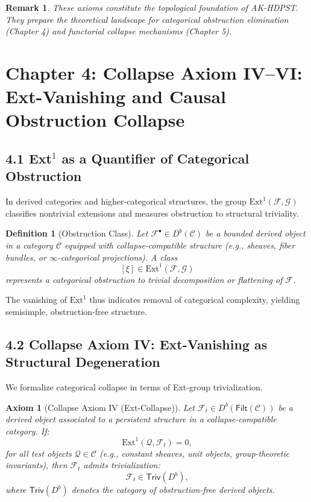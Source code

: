 \documentclass[11pt]{article}
\newtheorem{definition}[theorem]{Definition}
\newtheorem{remark}[theorem]{Remark}
\newtheorem{axiom}{Axiom}[section]
\begin{document}
\begin{remark}
These axioms constitute the topological foundation of AK-HDPST. They prepare the theoretical landscape for categorical obstruction elimination (Chapter 4) and functorial collapse mechanisms (Chapter 5).
\end{remark}



\section{Chapter 4: Collapse Axiom IV–VI: Ext-Vanishing and Causal Obstruction Collapse}

\subsection*{4.1 Ext$^1$ as a Quantifier of Categorical Obstruction}

In derived categories and higher-categorical structures, the group \( \mathrm{Ext}^1(\mathcal{F}, \mathcal{G}) \) classifies nontrivial extensions and measures obstruction to structural triviality.

\begin{definition}[Obstruction Class]
Let \( \mathcal{F}^\bullet \in D^b(\mathcal{C}) \) be a bounded derived object in a category \( \mathcal{C} \) equipped with collapse-compatible structure (e.g., sheaves, fiber bundles, or \(\infty\)-categorical projections).  
A class
\[
[\xi] \in \mathrm{Ext}^1(\mathcal{F}, \mathcal{G})
\]
represents a categorical obstruction to trivial decomposition or flattening of \( \mathcal{F} \).
\end{definition}

The vanishing of \( \mathrm{Ext}^1 \) thus indicates removal of categorical complexity, yielding semisimple, obstruction-free structure.

\subsection*{4.2 Collapse Axiom IV: Ext-Vanishing as Structural Degeneration}

We formalize categorical collapse in terms of Ext-group trivialization.

\begin{axiom}[Collapse Axiom IV (Ext-Collapse)]
Let \( \mathcal{F}_t \in D^b(\mathsf{Filt}(\mathcal{C})) \) be a derived object associated to a persistent structure in a collapse-compatible category.  
If:
\[
\mathrm{Ext}^1(\mathcal{Q}, \mathcal{F}_t) = 0,
\]
for all test objects \( \mathcal{Q} \in \mathcal{C} \) (e.g., constant sheaves, unit objects, group-theoretic invariants),  
then \( \mathcal{F}_t \) admits trivialization:
\[
\mathcal{F}_t \in \mathsf{Triv}(D^b),
\]
where \( \mathsf{Triv}(D^b) \) denotes the category of obstruction-free derived objects.
\end{axiom}
\end{document}
